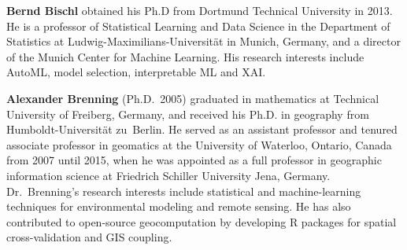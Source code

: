 \documentclass[remotesensing,article,submit,moreauthors,pdftex]{Definitions/mdpi}
\begin{document}
\bio
{}
{\textbf{Bernd Bischl} obtained his Ph.D from Dortmund Technical University in 2013.
	He is a professor of Statistical Learning and Data Science in the Department of Statistics at Ludwig-Maximilians-Universität in Munich, Germany, and a director of the Munich Center for Machine Learning.
	His research interests include AutoML, model selection, interpretable ML and XAI.}

\bio
{}
{\textbf{Alexander Brenning} (Ph.D.~2005) graduated in mathematics at Technical University of Freiberg, Germany, and received his Ph.D. in geography from Humboldt-Universität zu~Berlin.
	He served as an assistant professor and tenured associate professor in geomatics at the University of Waterloo, Ontario, Canada from 2007 until 2015, when he was appointed as a full professor in geographic information science at Friedrich Schiller University Jena, Germany.
	Dr.~Brenning's research interests include statistical and machine-learning techniques for environmental modeling and remote sensing.
	He has also contributed to open-source geocomputation by developing R packages for spatial cross-validation and GIS coupling.}

\end{document}
